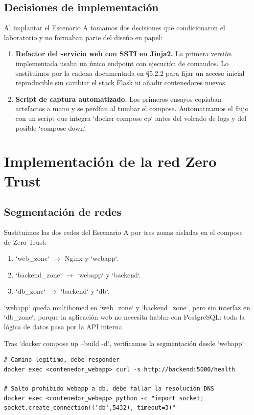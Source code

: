 \documentclass[11pt,spanish,listoffigures,listoftables]{tfgetsinf}
\begin{document}
        \subsection{Decisiones de implementación}
        Al implantar el Escenario A tomamos dos decisiones que condicionaron el laboratorio y no formaban parte del diseño en papel:
        \begin{enumerate}
            \item \textbf{Refactor del servicio web con SSTI en Jinja2.} La primera versión implementada usaba un único endpoint con ejecución de comandos. Lo sustituimos por la cadena documentada en §5.2.2 para fijar un acceso inicial reproducible sin cambiar el stack Flask ni añadir contenedores nuevos.
            \item \textbf{Script de captura automatizado.} Los primeros ensayos copiaban artefactos a mano y se perdían al tumbar el compose. Automatizamos el flujo con un script que integra `docker compose cp` antes del volcado de logs y del posible `compose down`.
        \end{enumerate}

    \section{Implementación de la red Zero Trust}
        \subsection{Segmentación de redes}
        Sustituimos las dos redes del Escenario A por tres zonas aisladas en el compose de Zero Trust:
        \begin{enumerate}
            \item `web\_zone` $\rightarrow$ Nginx y `webapp`.
            \item `backend\_zone` $\rightarrow$ `webapp` y `backend`.
            \item `db\_zone` $\rightarrow$ `backend` y `db`.
        \end{enumerate}
        
        `webapp` queda multihomed en `web\_zone` y `backend\_zone`, pero sin interfaz en `db\_zone`, porque la aplicación web no necesita hablar con PostgreSQL: toda la lógica de datos pasa por la API interna.
        
        Tras `docker compose up --build -d`, verificamos la segmentación desde `webapp`:
        \begin{lstlisting}
# Camino legítimo, debe responder
docker exec <contenedor_webapp> curl -s http://backend:5000/health

# Salto prohibido webapp a db, debe fallar la resolución DNS
docker exec <contenedor_webapp> python -c "import socket; socket.create_connection(('db',5432), timeout=3)"
        \end{lstlisting}
        
\end{document}
